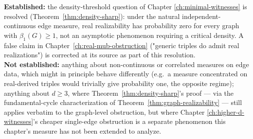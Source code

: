 \begin{ledgerentry}
\textbf{Established:} the density-threshold question of Chapter
\ref{ch:minimal-witnesses} is resolved (Theorem~\ref{thm:density-sharp}):
under the natural independent-continuous edge measure, real realizability
has probability zero for every graph with $\beta_1(G)\ge1$, not an
asymptotic phenomenon requiring a critical density. A false claim in
Chapter~\ref{ch:real-mub-obstruction} ("generic triples do admit real
realizations") is corrected at its source as part of this resolution.\\
\textbf{Not established:} anything about non-continuous or correlated
measures on edge data, which might in principle behave differently (e.g.\
a measure concentrated on real-derived triples would trivially give
probability one, the opposite regime); anything about $d\ge3$, where
Theorem~\ref{thm:density-sharp}'s proof — via the fundamental-cycle
characterization of Theorem~\ref{thm:graph-realizability} — still applies
verbatim to the graph-level obstruction, but where Chapter
\ref{ch:higher-d-witnesses}'s cheaper single-edge obstruction is a
separate phenomenon this chapter's measure has not been extended to
analyze.
\end{ledgerentry}
